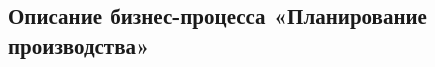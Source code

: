 \newpage
\subsection{Описание бизнес-процесса «Планирование производства»}
\label{bp:plan}


\begin{comment} %
\subsubsection{Сценарий ''Заполнение мощностей рабочих центров для предварительного планирования''}
\label{bp:plan_1}


\begin{enumerate}

\item \planner для каждого рабочего центра предприятия заполняет доступные мощности в системе \gofro в регистре \myobject{ОбъемыРабочихЦентров} на каждую дату производственного календаря.
\item Если ожидается поступление срочных или VIP заказов, тогда \planner занижает (при необходимости) емкости рабочих центров.
\end{enumerate}


\ifnum\IsOKP=1    %
\subsubsection{Сценарий ''Предварительное планирование производства''} 
\label{bp:plan_2}



\begin{enumerate}

\item \manager для определения возможности отгрузки продукции к затребованному заказчиком сроку в системе \gofro  в документе \myobject{Заявка} указывает позиции номенклатуры, желаемую дату и нажимает кнопку \myform{РасчетДаты}. \todo{Это откуда-то осталось. Будет ОКП у них???}
\item Модуль предварительного планирования из системы \gofro рассчитывает возможную дату и возвращает результат. Для каждой позиции строки документа \myobject{Заявка} определяется дата, в которую изделие можно отгрузить (с учетом объема уже набранных производственных заказов и заданной мощности рабочих центров). Если невозможно отгрузить в дату, указанную пользователем, то пользователю указывается другая предлагаемая системой \gofro дата отгрузки из горизонта поиска. Если изделие отгрузить в указанный период невозможно, то возвращается пустая дата. Если система \gofro предложила изменить дату отгрузки или отгрузка невозможна, то по каждому такому изделию дополнительно возвращается сообщение о станках, которые перегружены по объемам. 


\end{comment}
